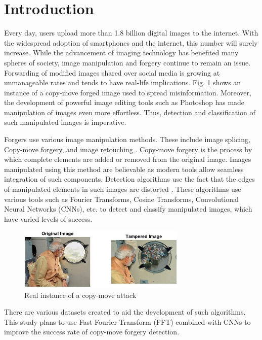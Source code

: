 \documentclass[conference]{IEEEtran}
\begin{document}
\section{Introduction}
Every day, users upload more than 1.8 billion digital images to the internet. With the widespread adoption of smartphones and the internet, this number will surely increase. While the advancement of imaging technology has benefited many spheres of society, image manipulation and forgery continue to remain an issue. Forwarding of modified images shared over social media is growing at unmanageable rates and tends to have real-life implications. Fig. \ref{modi} shows an instance of a copy-move forged image used to spread misinformation. Moreover, the development of powerful image editing tools such as Photoshop has made manipulation of images even more effortless. Thus, detection and classification of such manipulated images is imperative. 

Forgers use various image manipulation methods. These include image splicing, Copy-move forgery, and image retouching \cite{b1} \cite{b16}. Copy-move forgery is the process by which complete elements are added or removed from the original image. Images manipulated using this method are believable as modern tools allow seamless integration of such components. Detection algorithms use the fact that the edges of manipulated elements in such images are distorted \cite{b2}. These algorithms use various tools such as Fourier Transforms, Cosine Transforms, Convolutional Neural Networks (CNNs), etc. \cite{b1} to detect and classify manipulated images, which have varied levels of success. 

\begin{figure}[htpb]
\centerline{\includegraphics[width=8cm]{modi.jpg}}
\caption{Real instance of a copy-move attack \cite{b14}}
\label{modi}
\end{figure}

There are various datasets created to aid the development of such algorithms. This study plans to use Fast Fourier Transform (FFT) \cite{b10} combined with CNNs to improve the success rate of copy-move forgery detection.
\end{document}

